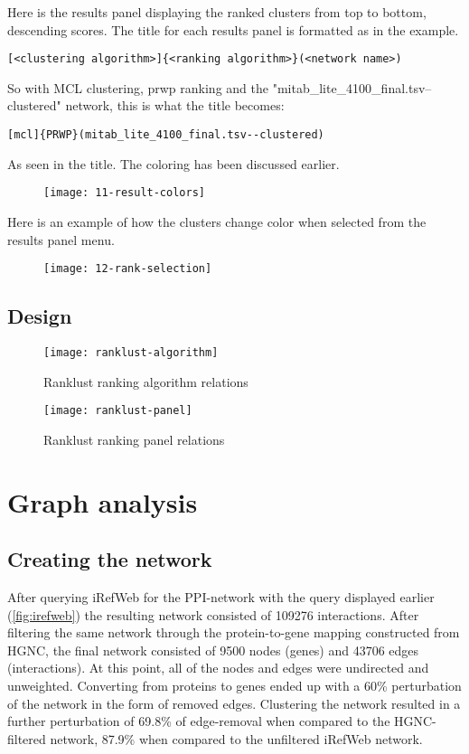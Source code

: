 Here is the results panel displaying the ranked clusters from top to bottom,
descending scores. The title for each results panel is formatted as in the
example.
\begin{Verbatim}[fontsize=\scriptsize]
[<clustering algorithm>]{<ranking algorithm>}(<network name>)
\end{Verbatim}
So with MCL clustering, \gls{prwp} ranking and the
"mitab\_lite\_4100\_final.tsv--clustered" network, this is what the title
becomes:
\begin{Verbatim}[fontsize=\scriptsize]
[mcl]{PRWP}(mitab_lite_4100_final.tsv--clustered)
\end{Verbatim}
As seen in the title. The coloring has been discussed earlier.
\begin{figure}[H]
    \label{fig:result-colors}
    \texttt{[image: 11-result-colors]}
\end{figure}

Here is an example of how the clusters change color when selected from the
results panel menu.
\begin{figure}[H]
    \label{fig:rank-selection}
    \texttt{[image: 12-rank-selection]}
\end{figure}

\section{Design}
\begin{figure}[H]
    \caption{Ranklust ranking algorithm relations}
    \label{fig:rank-alg}
    \texttt{[image: ranklust-algorithm]}
\end{figure}
\begin{figure}[H]
    \caption{Ranklust ranking panel relations}
    \label{fig:rank-panel}
    \texttt{[image: ranklust-panel]}
\end{figure}

\chapter{Graph analysis}
\section{Creating the network}
After querying iRefWeb for the PPI-network with the query displayed earlier
(\ref{fig:irefweb}) the resulting network consisted of 109276 interactions.
After filtering the same network through the protein-to-gene mapping constructed
from HGNC, the final network consisted of 9500 nodes (genes) and 43706 edges
(interactions). At this point, all of the nodes and edges were undirected and
unweighted. Converting from proteins to genes ended up with a 60\% perturbation
of the network in the form of removed edges. Clustering the network resulted in
a further perturbation of 69.8\% of edge-removal when compared to the
HGNC-filtered network, 87.9\% when compared to the unfiltered iRefWeb network.

